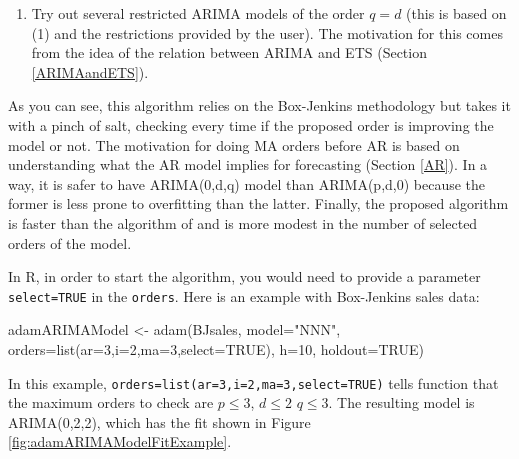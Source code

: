 \documentclass[
]{book}
\newenvironment{Shaded}{\begin{snugshade}}{\end{snugshade}}
\newcommand{\AttributeTok}[1]{\textcolor[rgb]{0.77,0.63,0.00}{#1}}
\newcommand{\ConstantTok}[1]{\textcolor[rgb]{0.00,0.00,0.00}{#1}}
\newcommand{\DecValTok}[1]{\textcolor[rgb]{0.00,0.00,0.81}{#1}}
\newcommand{\FunctionTok}[1]{\textcolor[rgb]{0.00,0.00,0.00}{#1}}
\newcommand{\NormalTok}[1]{#1}
\newcommand{\OtherTok}[1]{\textcolor[rgb]{0.56,0.35,0.01}{#1}}
\newcommand{\StringTok}[1]{\textcolor[rgb]{0.31,0.60,0.02}{#1}}
\providecommand{\tightlist}{%
  \setlength{\itemsep}{0pt}\setlength{\parskip}{0pt}}
\theoremstyle{definition}
\theoremstyle{definition}
\theoremstyle{definition}
\theoremstyle{definition}
\theoremstyle{remark}
\begin{document}
\begin{enumerate}
\def\labelenumi{\arabic{enumi}.}
\setcounter{enumi}{2}
\tightlist
\item
  Try out several restricted ARIMA models of the order \(q=d\) (this is based on (1) and the restrictions provided by the user). The motivation for this comes from the idea of the relation between ARIMA and ETS (Section \ref{ARIMAandETS}).
\end{enumerate}

As you can see, this algorithm relies on the Box-Jenkins methodology but takes it with a pinch of salt, checking every time if the proposed order is improving the model or not. The motivation for doing MA orders before AR is based on understanding what the AR model implies for forecasting (Section \ref{AR}). In a way, it is safer to have ARIMA(0,d,q) model than ARIMA(p,d,0) because the former is less prone to overfitting than the latter. Finally, the proposed algorithm is faster than the algorithm of \citet{Svetunkov2019} and is more modest in the number of selected orders of the model.

In R, in order to start the algorithm, you would need to provide a parameter \texttt{select=TRUE} in the \texttt{orders}. Here is an example with Box-Jenkins sales data:

\begin{Shaded}
\begin{Highlighting}[]
\NormalTok{adamARIMAModel }\OtherTok{\textless{}{-}} \FunctionTok{adam}\NormalTok{(BJsales, }\AttributeTok{model=}\StringTok{"NNN"}\NormalTok{,}
                       \AttributeTok{orders=}\FunctionTok{list}\NormalTok{(}\AttributeTok{ar=}\DecValTok{3}\NormalTok{,}\AttributeTok{i=}\DecValTok{2}\NormalTok{,}\AttributeTok{ma=}\DecValTok{3}\NormalTok{,}\AttributeTok{select=}\ConstantTok{TRUE}\NormalTok{),}
                       \AttributeTok{h=}\DecValTok{10}\NormalTok{, }\AttributeTok{holdout=}\ConstantTok{TRUE}\NormalTok{)}
\end{Highlighting}
\end{Shaded}

In this example, \texttt{orders=list(ar=3,i=2,ma=3,select=TRUE)} tells function that the maximum orders to check are \(p\leq 3\), \(d\leq 2\) \(q\leq 3\). The resulting model is ARIMA(0,2,2), which has the fit shown in Figure \ref{fig:adamARIMAModelFitExample}.
\end{document}
